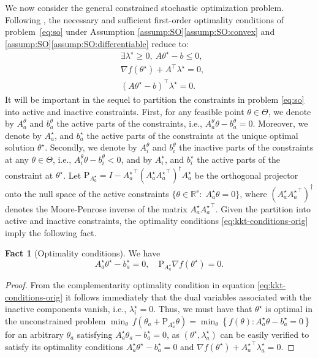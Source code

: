 \documentclass[11pt,a4paper]{article}
\theoremstyle{definition}
\newtheorem{fact}[theorem]{Fact}
\newcommand{\set}[2]{\left\{ #1 : #2 \right\}}
\begin{document}
We now consider the general constrained stochastic optimization problem.
Following \citep[Proposition 5.4.7]{bertsekas2009convex}, the necessary and sufficient first-order optimality conditions of problem~\eqref{eq:so} under Assumption \ref{assump:SO}\ref{assump:SO:convex} and \ref{assump:SO}\ref{assump:SO:differentiable} reduce to:
\begin{equation}
  \label{eq:kkt-conditions-orig}
  \begin{split}
    &\exists \lambda^\star\geq 0,~ A \theta^\star - b \leq 0,\\
    &\nabla {f}(\theta^\star) + A^\top \lambda^\star=0, \\
    &(A \theta^\star - b)^\top \lambda^\star = 0.
  \end{split}
\end{equation}
It will be important in the sequel to partition the constraints in problem \eqref{eq:so} into active and inactive constraints.
First, for any feasible point $\theta \in \Theta$, we denote by $A_a^\theta$ and $b_a^\theta$ the active parts of the constraints, i.e., $A_{a}^\theta \theta - b_a^\theta=0$. Moreover, we denote by $A^\star_a$, and $b_a^\star$ the active parts of the constraints at the unique optimal solution $\theta^\star$. Secondly, we denote by $A_i^\theta$ and $b_i^\theta$ the inactive parts of the constraints at any $\theta \in \Theta$, i.e., $A_{i}^\theta \theta - b_i^\theta<0$, and by $A^\star_i$, and $b_i^\star$ the active parts of the constraint at $\theta^\star$. Let $\text{P}_{A^\star_a}= I - {A^\star_{a}}^\top ({A^\star_{a}} {A^\star_{a}}^\top)^\dagger {A^\star_{a}}$ be the orthogonal projector onto the null space of the active constraints $\{\theta \in \mathbb R^s:\; A^\star_{a} \theta = 0\}$, 
where $({A^\star_{a}} {A^\star_{a}}^\top)^\dagger$ denotes the Moore-Penrose inverse of the matrix ${A^\star_{a}} {A^\star_{a}}^\top$. Given the partition into active and inactive constraints, the optimality conditions \eqref{eq:kkt-conditions-orig} imply the following fact.

\begin{fact}[Optimality conditions]
\label{fact:optimality:conditions}
  We have
  \begin{equation}
  \label{eq:kkt-conditions}
  A^\star_a \theta^\star - b_a^\star=0, \quad \text{P}_{A^\star_a} \nabla {f}(\theta^\star)=0.
\end{equation}
\end{fact}
\begin{proof}
From the complementarity optimality condition in equation \eqref{eq:kkt-conditions-orig} it follows immediately that the dual variables associated with the inactive components vanish, i.e., $\lambda^\star_i=0$.
Thus, we must have that $\theta^\star$ is optimal in the unconstrained problem
$\min_\theta\, {f}(\theta_a + \text{P}_{A^\star_a}\theta) = \min_\theta \set{{f}(\theta)}{A^\star_a\theta-b^\star_a=0}$ for an arbitrary $\theta_a$ satisfying $A^\star_{a} \theta_a - b^\star_a=0$, as $(\theta^\star, \lambda_a^\star)$ can be easily verified to satisfy its optimality conditions $A^\star_a \theta^\star - b_a^\star=0$ and $\nabla {f}(\theta^\star) + {A^\star_a}^\top \lambda_a^\star=0$.
\end{proof}
\end{document}
